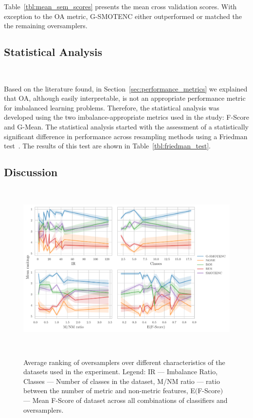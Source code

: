 \documentclass[parskip=full]{scrartcl}
\begin{document}


Table~\ref{tbl:mean_sem_scores} presents the mean cross validation scores.
With exception to the OA metric, G-SMOTENC either outperformed or matched the
the remaining oversamplers.



\subsection{Statistical Analysis}~\label{sec:statistical_analysis}

Based on the literature found, in Section~\ref{sec:performance_metrics} we
explained that OA, although easily interpretable, is not an appropriate
performance metric for imbalanced learning problems. Therefore, the
statistical analysis was developed using the two imbalance-appropriate metrics
used in the study: F-Score and G-Mean. The statistical analysis started with
the assessment of a statistically significant difference in performance across
resampling methods using a Friedman test~\cite{friedman1937use}. The results
of this test are shown in Table~\ref{tbl:friedman_test}.









\subsection{Discussion}~\label{sec:discussion}

\begin{figure}
	\centering
	\includegraphics[width=\linewidth]{../analysis/consistency_analysis_plot}
    \caption{Average ranking of oversamplers over different characteristics of
        the datasets used in the experiment. Legend: IR --- Imbalance Ratio,
        Classes --- Number of classes in the dataset, M/NM ratio --- ratio
        between the number of metric and non-metric features, E$($F-Score$)$
        --- Mean F-Score of dataset across all combinations of classifiers and
        oversamplers.
    }~\label{fig:consistency_analysis}
\end{figure}
\end{document}
